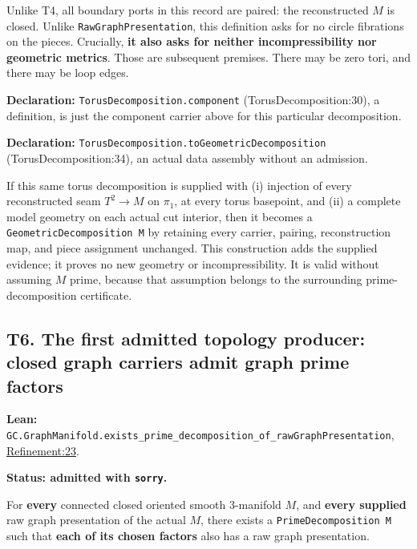 \documentclass[
  letterpaper,
  11pt]{article}
\begin{document}
Unlike T4, all boundary ports in this record are paired: the
reconstructed \(M\) is closed. Unlike
{\small\texttt{Raw\allowbreak{}Graph\allowbreak{}Presentation}}, this
definition asks for no circle fibrations on the pieces. Crucially,
\textbf{it also asks for neither incompressibility nor geometric
metrics}. Those are subsequent premises. There may be zero tori, and
there may be loop edges.

\textbf{Declaration:}
{\small\texttt{Torus\allowbreak{}Decomposition.\allowbreak{}component}}
(TorusDecomposition:30), a definition, is just the component carrier
above for this particular decomposition.

\textbf{Declaration:}
{\small\texttt{Torus\allowbreak{}Decomposition.\allowbreak{}to\allowbreak{}Geometric\allowbreak{}Decomposition}}
(TorusDecomposition:34), an actual data assembly without an admission.

If this same torus decomposition is supplied with (i) injection of every
reconstructed seam \(T^2\to M\) on \(\pi_1\), at every torus basepoint,
and (ii) a complete model geometry on each actual cut interior, then it
becomes a {\small\texttt{Geometric\allowbreak{}Decomposition M}} by
retaining every carrier, pairing, reconstruction map, and piece
assignment unchanged. This construction adds the supplied evidence; it
proves no new geometry or incompressibility. It is valid without
assuming \(M\) prime, because that assumption belongs to the surrounding
prime-decomposition certificate.

\subsection{T6. The first admitted topology producer: closed graph
carriers admit graph prime factors}\label{t6}

\textbf{Lean:}
{\small\texttt{GC.\allowbreak{}Graph\allowbreak{}Manifold.\allowbreak{}exists\_\allowbreak{}prime\_\allowbreak{}decomposition\_\allowbreak{}of\_\allowbreak{}raw\allowbreak{}Graph\allowbreak{}Presentation}},
\href{https://github.com/qinz1yang/differential-geometry-dev/blob/ea0fae60ee01ef8c8d9b57a51794c6538f679c5d/DifferentialGeometry/Topology/ThreeManifold/GraphManifold/Refinement.lean\#L23}{Refinement:23}.

\textbf{Status: admitted with {\small\texttt{sorry}}.}

For \textbf{every} connected closed oriented smooth 3-manifold \(M\),
and \textbf{every supplied} raw graph presentation of the actual \(M\),
there exists a {\small\texttt{Prime\allowbreak{}Decomposition M}} such
that \textbf{each of its chosen factors} also has a raw graph
presentation.
\end{document}

